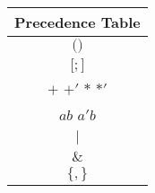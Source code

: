 \begin{tabular}{ |c| }
    \hline
    \textbf{Precedence Table} \\
    \hline
    $($\quad$)$ \\
    \hline
    $[$\quad$;$\quad$]$ \\
    \hline
    $+$ \quad $+'$ \quad $*$ \quad $*'$ \\
    \hline
    $ab$ \quad $a'b$ \\
    \hline
    $|$ \\
    \hline
    $\&$ \\
    \hline
    $\{$\quad$,$\quad$\}$ \\
    \hline
\end{tabular}
